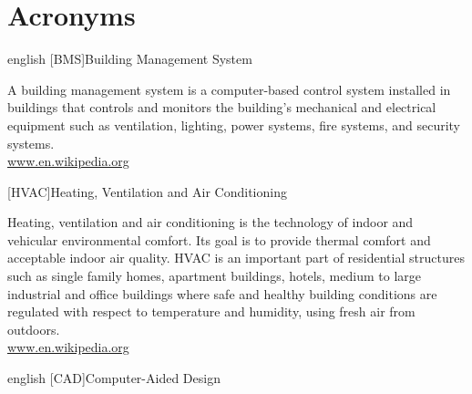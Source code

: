 %
%
\cleardoublepage
%
\chapter{Acronyms}
%
%
\begin{acronym}[OpenFOAM]	%
%
%
%
%
\begin{otherlanguage*}{english}
%
[BMS]{Building Management System}

{\smaller A building management system is a computer-based control system installed in buildings that controls and monitors the building’s mechanical and electrical equipment such as ventilation, lighting, power systems, fire systems, and security systems.\\
\href{https://en.wikipedia.org/wiki/Building_management_system}{www.en.wikipedia.org}
\par}
%
\end{otherlanguage*}
%
%
[HVAC]{Heating, Ventilation and Air Conditioning}

{\smaller Heating, ventilation and air conditioning is the technology of indoor and vehicular environmental comfort. Its goal is to provide thermal comfort and acceptable indoor air quality. HVAC is an important part of residential structures such as single family homes, apartment buildings, hotels, medium to large industrial and office buildings where safe and healthy building conditions are regulated with respect to temperature and humidity, using fresh air from outdoors.\\
\href{https://en.wikipedia.org/wiki/HVAC}{www.en.wikipedia.org}
\par}
%
%
\begin{otherlanguage*}{english}
%
[CAD]{Computer-Aided Design}


\end{otherlanguage*}
\end{acronym}

